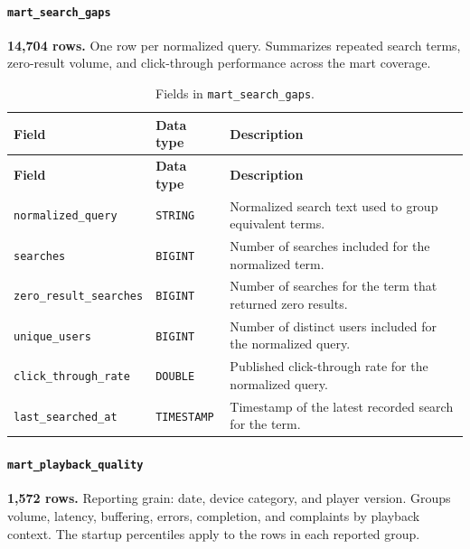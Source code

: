 \documentclass[a4paper,12pt]{article}
\newcommand{\dbsep}{\_\allowbreak}
\begin{document}
\paragraph{\texttt{mart\dbsep search\dbsep gaps}}
\textbf{14,704 rows.} One row per normalized query.
Summarizes repeated search terms, zero-result volume, and click-through performance across the mart coverage.

\begingroup
\small
\setlength{\tabcolsep}{4pt}
\renewcommand{\arraystretch}{1.1}
\begin{longtable}{@{}>{\raggedright\arraybackslash}p{}
                    >{\raggedright\arraybackslash}p{}
                    >{\raggedright\arraybackslash}p{}@{}}
\caption{Fields in \texttt{mart\dbsep search\dbsep gaps}.}\\
\toprule
\textbf{Field} & \textbf{Data type} & \textbf{Description}\\
\midrule
\endfirsthead
\toprule
\textbf{Field} & \textbf{Data type} & \textbf{Description}\\
\midrule
\endhead
\bottomrule
\endfoot
\texttt{normalized\dbsep query} & \texttt{STRING} & Normalized search text used to group equivalent terms.\\
\texttt{searches} & \texttt{BIGINT} & Number of searches included for the normalized term.\\
\texttt{zero\dbsep result\dbsep searches} & \texttt{BIGINT} & Number of searches for the term that returned zero results.\\
\texttt{unique\dbsep users} & \texttt{BIGINT} & Number of distinct users included for the normalized query.\\
\texttt{click\dbsep through\dbsep rate} & \texttt{DOUBLE} & Published click-through rate for the normalized query.\\
\texttt{last\dbsep searched\dbsep at} & \texttt{TIMESTAMP} & Timestamp of the latest recorded search for the term.\\
\end{longtable}
\endgroup

\paragraph{\texttt{mart\dbsep playback\dbsep quality}}
\textbf{1,572 rows.} Reporting grain: date, device category, and player version.
Groups volume, latency, buffering, errors, completion, and complaints by playback context. The startup percentiles apply to the rows in each reported group.
\end{document}
